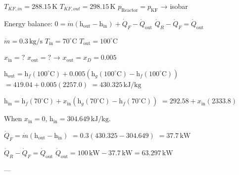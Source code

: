 \( T_{KF,in} = 288.15 \, \text{K} \)  
\( T_{KF,out} = 298.15 \, \text{K} \)  
\( p_{\text{Reactor}} = p_{\text{KF}} \) → isobar  

Energy balance:  
\( 0 = \dot{m} (\text{h}_{\text{out}} - \text{h}_{\text{in}}) + \dot{Q}_F - \dot{Q}_{\text{out}} \)  
\( \dot{Q}_R - \dot{Q}_F = \dot{Q}_{\text{out}} \)  

\( \dot{m} = 0.3 \, \text{kg/s} \)  
\( T_{\text{in}} = 70^\circ \text{C} \)  
\( T_{\text{out}} = 100^\circ \text{C} \)  

\( x_{\text{in}} = ? \)  
\( x_{\text{out}} = ? \) → \( x_{\text{out}} = x_D = 0.005 \)  

\( \text{h}_{\text{out}} = \text{h}_f(100^\circ \text{C}) + 0.005 (\text{h}_g(100^\circ \text{C}) - \text{h}_f(100^\circ \text{C})) \)  
\( = 419.04 + 0.005 (2257.0) \)  
\( = 430.325 \, \text{kJ/kg} \)  

\( \text{h}_{\text{in}} = \text{h}_f(70^\circ \text{C}) + x_{\text{in}} (\text{h}_g(70^\circ \text{C}) - \text{h}_f(70^\circ \text{C})) \)  
\( = 292.58 + x_{\text{in}} (2333.8) \)  

When \( x_{\text{in}} = 0 \), \( \text{h}_{\text{in}} = 304.649 \, \text{kJ/kg} \).  

\( \dot{Q}_F = \dot{m} (\text{h}_{\text{out}} - \text{h}_{\text{in}}) \)  
\( = 0.3 (430.325 - 304.649) \)  
\( = 37.7 \, \text{kW} \)  

\( \dot{Q}_R - \dot{Q}_F = \dot{Q}_{\text{out}} \)  
\( \dot{Q}_{\text{out}} = 100 \, \text{kW} - 37.7 \, \text{kW} = 63.297 \, \text{kW} \)  

---